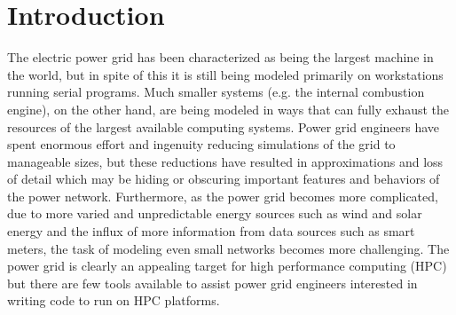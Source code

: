 \documentclass{acm_proc_article-sp}
\begin{document}
\begin{abstract}
This paper describes the GridPACK\texttrademark framework, which is designed to help
power grid engineers develop modeling software capable of running on high
performance computers. The framework contains modules for setting up distributed
power grid networks, assigning buses and branches with arbitrary behaviors to
the network, creating distributed matrices and vectors, using parallel linear
and non-linear solvers to solve algebraic equations, and mapping functionality
to create matrices and vectors based on properties of the network. In addition,
the framework contains additional functionality to support IO and to manage
errors. The goal of GridPACK\texttrademark is to provide developers with a
comprehensive set of modules that can substantially reduce the complexity of
writing software for parallel computers
while still providing efficient and scalable software solutions.
\end{abstract}


\section{Introduction}
The electric power grid has been characterized as being the largest machine in
the world, but in spite of this it is still being modeled primarily on workstations running
serial programs. Much smaller systems (e.g. the internal combustion engine\cite{EXACT}),
on the other hand, are being modeled in ways that can fully exhaust the resources of
the largest available computing systems. Power grid engineers have spent
enormous effort and ingenuity reducing simulations of the grid to manageable sizes,
but these reductions have resulted in approximations and loss of detail which may
be hiding or obscuring important features and behaviors of the power network.
Furthermore, as the
power grid becomes more complicated, due to more varied and unpredictable energy sources
such as wind and solar energy and the influx of more information from data sources
such as smart
meters, the task of modeling even small networks becomes more challenging. The
power grid is clearly an appealing target for high performance computing (HPC)
but there are few
tools available to assist power grid engineers interested in writing code to run on
HPC platforms.
\end{document}
